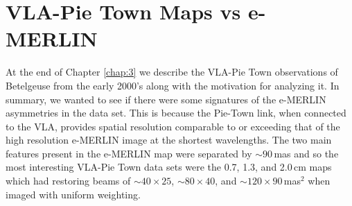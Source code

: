 \section{VLA-Pie Town Maps vs e-MERLIN}\label{sec:5.13}
At the end of Chapter \ref{chap:3} we describe the VLA-Pie Town observations of Betelgeuse from the early 2000's along with the motivation for analyzing it. In summary, we wanted to see if there were some signatures of the e-MERLIN asymmetries in the data set. This is because the Pie-Town link, when connected to the VLA, provides spatial resolution comparable to or exceeding that of the high resolution e-MERLIN image at the shortest wavelengths. The two main features present in the e-MERLIN map were separated by $\sim 90$\,mas and so the most interesting VLA-Pie Town data sets were the 0.7, 1.3, and 2.0\,cm maps which had restoring beams of $\sim 40 \times 25$, $\sim 80 \times 40$, and $\sim 120 \times 90$\,mas$^{2}$ when imaged with uniform weighting. 


